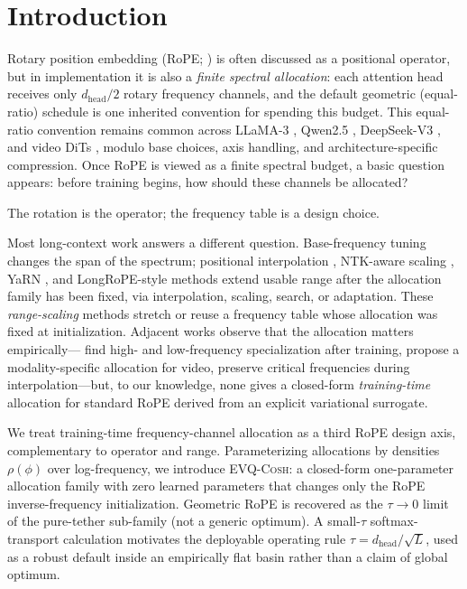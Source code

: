 \section{Introduction}

Rotary position embedding (RoPE; \citealp{su2024roformer}) is often discussed as a positional operator, but in implementation it is also a \emph{finite spectral allocation}: each attention head receives only $d_{\mathrm{head}}/2$ rotary frequency channels, and the default geometric (equal-ratio) schedule is one inherited convention for spending this budget. This equal-ratio convention remains common across LLaMA-3 \citep{grattafiori2024llama3}, Qwen2.5 \citep{qwen2024qwen25}, DeepSeek-V3 \citep{deepseekv3}, and video DiTs \citep{videorope2025}, modulo base choices, axis handling, and architecture-specific compression. Once RoPE is viewed as a finite spectral budget, a basic question appears: before training begins, how should these channels be allocated?

The rotation is the operator; the frequency table is a design choice.

Most long-context work answers a different question. Base-frequency tuning changes the span of the spectrum; positional interpolation \citep{chen2024position}, NTK-aware scaling \citep{roziere2023codellama}, YaRN \citep{peng2024yarn}, and LongRoPE-style methods \citep{ding2024longrope,shang2025longrope2} extend usable range after the allocation family has been fixed, via interpolation, scaling, search, or adaptation. These \emph{range-scaling} methods stretch or reuse a frequency table whose allocation was fixed at initialization. Adjacent works observe that the allocation matters empirically---\citet{barbero2025round} find high- and low-frequency specialization after training, \citet{videorope2025} propose a modality-specific allocation for video, \citet{wang2024resonance} preserve critical frequencies during interpolation---but, to our knowledge, none gives a closed-form \emph{training-time} allocation for standard RoPE derived from an explicit variational surrogate.

We treat training-time frequency-channel allocation as a third RoPE design axis, complementary to operator and range. Parameterizing allocations by densities $\rho(\phi)$ over log-frequency, we introduce \textsc{EVQ-Cosh}: a closed-form one-parameter allocation family with zero learned parameters that changes only the RoPE inverse-frequency initialization. Geometric RoPE is recovered as the $\tau{\to}0$ limit of the pure-tether sub-family (not a generic optimum). A small-$\tau$ softmax-transport calculation motivates the deployable operating rule $\tau{=}d_{\mathrm{head}}/\sqrt{L}$, used as a robust default inside an empirically flat basin rather than a claim of global optimum.


